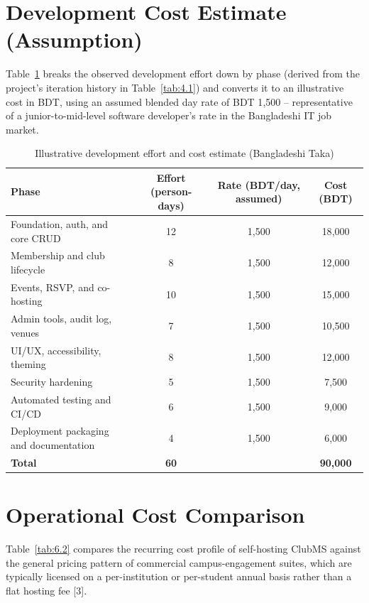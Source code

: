 \documentclass[12pt,oneside]{book}
\begin{document}
\section{Development Cost Estimate (Assumption)}

Table~\ref{tab:6.1} breaks the observed development effort down by phase (derived from the project's iteration history in Table~\ref{tab:4.1}) and converts it to an illustrative cost in BDT, using an assumed blended day rate of BDT 1{,}500 -- representative of a junior-to-mid-level software developer's rate in the Bangladeshi IT job market.

\begin{table}[H]
\caption{Illustrative development effort and cost estimate (Bangladeshi Taka)}
\label{tab:6.1}
\centering
\small
\begin{tabularx}{\textwidth}{@{}Xccc@{}}
\toprule
Phase & Effort (person-days) & Rate (BDT/day, assumed) & Cost (BDT) \\
\midrule
Foundation, auth, and core CRUD & 12 & 1{,}500 & 18{,}000 \\
Membership and club lifecycle & 8 & 1{,}500 & 12{,}000 \\
Events, RSVP, and co-hosting & 10 & 1{,}500 & 15{,}000 \\
Admin tools, audit log, venues & 7 & 1{,}500 & 10{,}500 \\
UI/UX, accessibility, theming & 8 & 1{,}500 & 12{,}000 \\
Security hardening & 5 & 1{,}500 & 7{,}500 \\
Automated testing and CI/CD & 6 & 1{,}500 & 9{,}000 \\
Deployment packaging and documentation & 4 & 1{,}500 & 6{,}000 \\
\midrule
\textbf{Total} & \textbf{60} & & \textbf{90{,}000} \\
\bottomrule
\end{tabularx}
\end{table}

\section{Operational Cost Comparison}

Table~\ref{tab:6.2} compares the recurring cost profile of self-hosting ClubMS against the general pricing pattern of commercial campus-engagement suites, which are typically licensed on a per-institution or per-student annual basis rather than a flat hosting fee [3].
\end{document}
